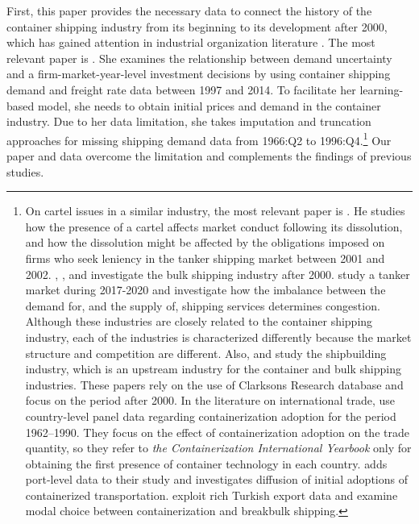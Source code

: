 \documentclass[11pt]{article}
\begin{document}
First, this paper provides the necessary data to connect the history of the container shipping industry from its beginning to its development after 2000, which has gained attention in industrial organization literature \citep{aguirregabiria2021dynamic}. The most relevant paper is \cite{jeon2017learning}. She examines the relationship between demand uncertainty and a firm-market-year-level investment decisions by using container shipping demand and freight rate data between 1997 and 2014. To facilitate her learning-based model, she needs to obtain initial prices and demand in the container industry. Due to her data limitation, she takes imputation and truncation approaches for missing shipping demand data from 1966:Q2 to 1996:Q4.\footnote{On cartel issues in a similar industry, the most relevant paper is \cite{asker2010leniency}. He studies how the presence of a cartel affects market conduct following its dissolution, and how the dissolution might be affected by the obligations imposed on firms who seek leniency in the  tanker shipping market between 2001 and 2002. \cite{kalouptsidi2014aer}, \cite{brancaccio2020geography}, and \cite{greenwood2015waves} investigate the bulk shipping industry after 2000. \cite{bai2021congestion} study a tanker market during 2017-2020 and investigate how the imbalance between the demand for, and the supply of, shipping services
determines congestion. Although these industries are closely related to the container shipping industry, each of the industries is characterized differently because the market structure and competition are different. Also, \cite{kalouptsidi2017res} and \cite{barwick2019china} study the shipbuilding industry, which is an upstream industry for the container and bulk shipping industries. These papers rely on the use of Clarksons Research database and focus on the period after 2000. In the literature on international trade, \cite{bernhofen2016estimating} use country-level panel data regarding containerization adoption for the period 1962–1990. They focus on the effect of containerization adoption on the trade quantity, so they refer to \textit{the Containerization International Yearbook} only for obtaining the first presence of container technology in each country. \cite{rua2014diffusion} adds port-level data to their study and investigates diffusion of initial adoptions of containerized transportation. \cite{cocsar2018shipping} exploit rich Turkish export data and examine modal choice between containerization and breakbulk shipping.} Our paper and data overcome the limitation and complements the findings of previous studies.  
\end{document}
